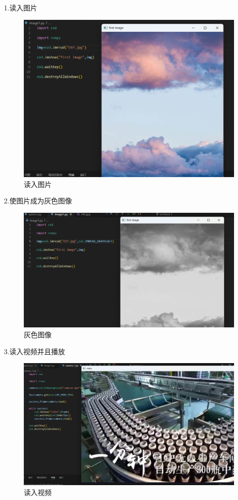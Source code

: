 \documentclass[a4paper, 12pt]{article}
\begin{document}
1.读入图片
\begin{figure}[H]
  \centering
  \includegraphics[width=1\textwidth]{屏幕截图 2024-09-12 151958.png}
  \caption{读入图片}
    \end{figure}

2.使图片成为灰色图像
\begin{figure}[H]
  \centering
  \includegraphics[width=1\textwidth]{屏幕截图 2024-09-12 153303.png}
  \caption{灰色图像}
    \end{figure}



3.读入视频并且播放
\begin{figure}[H]
  \centering
  \includegraphics[width=1\textwidth]{屏幕截图 2024-09-12 154925.png}
  \caption{读入视频}
    \end{figure}
\end{document}
